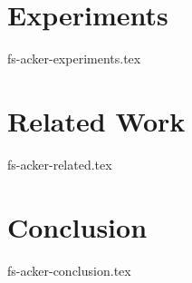 \documentclass[sigconf]{acmart}
\newcommand {\tracker} {trAcker}
\begin{document}
\section {Experiments}
 {fs-acker-experiments.tex}

\section{Related Work}
 {fs-acker-related.tex}

\section {Conclusion}
 {fs-acker-conclusion.tex}



% 

\end{document}
